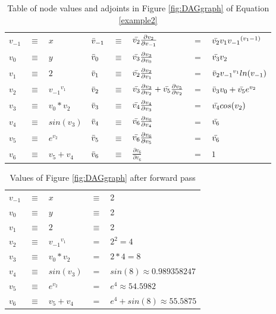 \documentclass{article}
\begin{document}
\begin{table}[h!]
    \centering
    \begin{tabular}{|lcl|lclll|}
        \hline
        $v_{-1}$ & $\equiv$ & $x$ & $\Bar{v}_{-1}$ & $\equiv$ & $\Bar{v_2}\frac{\partial{v_2}}{\partial{v_{-1}}}$ & $=$ & $\Bar{v_2}v_1 {v_{-1}}^{(v_{1}-1)}$\\
        $v_{0}$ & $\equiv$ & $y$ & $\Bar{v}_{0}$ & $\equiv$ & $\Bar{v_3}\frac{\partial{v_3}}{\partial{v_0}}$ & $=$ & $\Bar{v_3}v_2$\\
        \hline
        $v_{1}$ & $\equiv$ & $2$ & $\Bar{v}_{1}$ & $\equiv$ & $\Bar{v_2}\frac{\partial{v_2}}{\partial{v_1}}$ & $=$ & $\Bar{v}_{2}{v_{-1}}^{v_{1}}ln(v_{-1})$\\
        $v_{2}$ & $\equiv$ & ${v_{-1}}^{v_{1}}$ & $\Bar{v}_{2}$ & $\equiv$ & $\Bar{v_3}\frac{\partial{v_3}}{\partial{v_2}} + \Bar{v_5}\frac{\partial{v_5}}{\partial{v_2}}$ & $=$ & $\Bar{v}_{3}v_0 + \Bar{v_5}e^{v_2}$\\
        $v_{3}$ & $\equiv$ & ${v_{0}}*{v_{2}}$ & $\Bar{v}_{3}$ & $\equiv$ & $\Bar{v_4}\frac{\partial{v_4}}{\partial{v_3}}$ & $=$ & $\Bar{v_4}cos(v_2)$\\
        $v_{4}$ & $\equiv$ & $sin(v_3)$ & $\Bar{v}_{4}$ & $\equiv$ & $\Bar{v_6}\frac{\partial{v_6}}{\partial{v_4}}$ & $=$ & $\Bar{v_6}$\\
        $v_{5}$ & $\equiv$ & $e^{v_2}$ & $\Bar{v}_{5}$ & $\equiv$ & $\Bar{v_6}\frac{\partial{v_6}}{\partial{v_5}}$ & $=$ & $\Bar{v_6}$\\
        \hline
        $v_{6}$ & $\equiv$ & $v_5 + v_4$ & $\Bar{v}_{6}$ & $\equiv$ & $\frac{\partial{v_6}}{\partial{v_6}}$ & $=$ & $1$\\
        \hline
    \end{tabular}
    \caption{Table of node values and adjoints in Figure \ref{fig:DAGgraph} of Equation \ref{example2}}
    \label{tab:example1}
\end{table}

\begin{table}[h!]
    \centering
    \begin{tabular}{|lclll|}
        \hline
        $v_{-1}$ & $\equiv$ & $x$ & $\equiv$ & 2\\
        $v_{0}$ & $\equiv$ & $y$ & $\equiv$ & 2\\
        \hline
        $v_{1}$ & $\equiv$ & $2$ & $\equiv$ & 2\\
        $v_{2}$ & $\equiv$ & ${v_{-1}}^{v_{1}}$ & $=$ & $ 2^2 = 4$\\
        $v_{3}$ & $\equiv$ & $v_0 * v_2$ & $=$ & $ 2 * 4 = 8$\\
        $v_{4}$ & $\equiv$ & $sin(v_3)$ & $=$ & $ sin(8) \approx 0.989358247$\\
        $v_{5}$ & $\equiv$ & $e^{v_2}$ & $=$ & $ e^4 \approx 54.5982$\\
        \hline
        $v_{6}$ & $\equiv$ & $v_5 + v_4$ & $=$ & $e^4 + sin(8) \approx 55.5875$\\
        \hline
    \end{tabular}
    \caption{Values of Figure \ref{fig:DAGgraph} after forward pass}
    \label{tab:example1FP}
\end{table}
\end{document}
